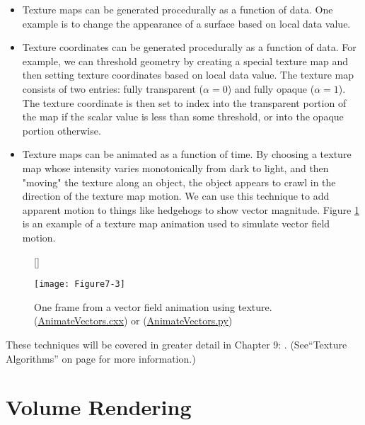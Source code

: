 \begin{itemize}

	\item Texture maps can be generated procedurally as a function of data. One example is to change the appearance of a surface based on local data value.

	\item Texture coordinates can be generated procedurally as a function of data. For example, we can threshold geometry by creating a special texture map and then setting texture coordinates based on local data value. The texture map consists of two entries: fully transparent ($\alpha = 0$) and fully opaque ($\alpha = 1$). The texture coordinate is then set to index into the transparent portion of the map if the scalar value is less than some threshold, or into the opaque portion otherwise.

	\item Texture maps can be animated as a function of time. By choosing a texture map whose intensity varies monotonically from dark to light, and then "moving" the texture along an object, the object appears to crawl in the direction of the texture map motion. We can use this technique to add apparent motion to things like hedgehogs to show vector magnitude. Figure \ref{fig:Figure7-3} is an example of a texture map animation used to simulate vector field motion.

\end{itemize}

\begin{figure}[!htb]
	[\FBwidth]
	{\caption{One frame from a vector field animation using texture.(\href{https://lorensen.github.io/VTKExamples/site/Cxx/Texture/AnimateVectors/}{AnimateVectors.cxx}) or (\href{https://lorensen.github.io/VTKExamples/site/Python/Texture/AnimateVectors/}{AnimateVectors.py})}\label{fig:Figure7-3}}
	{\texttt{[image: Figure7-3]}}
\end{figure}

These techniques will be covered in greater detail in Chapter 9: . (See``Texture Algorithms'' on page \pageref{subsec:texture_algorithms} for more information.)

\section{Volume Rendering}
\label{sec:volume_rendering}

